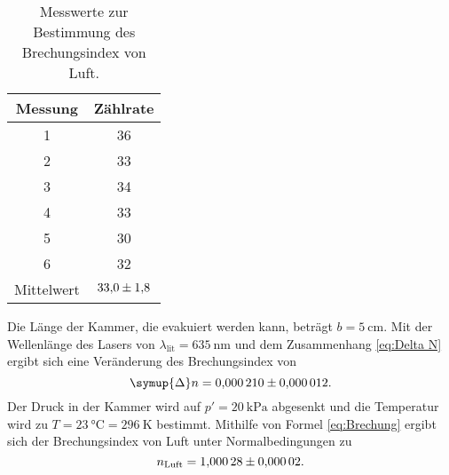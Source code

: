 \begin{table} [H]
    \centering
    \caption{Messwerte zur Bestimmung des Brechungsindex von Luft.}
    \label{tab:Brechungsindex}
    \begin{tabular}{S S}
      \toprule
      {Messung} & {Zählrate} \\
        & 36 \\
      2  & 33 \\
      3  & 34 \\
      4  & 33 \\
      5  & 30 \\
      6  & 32 \\
      \midrule
      {Mittelwert} & $\num{33.0+-1.8}$ \\  
      \bottomrule
    \end{tabular}
\end{table}

Die Länge der Kammer, die evakuiert werden kann, beträgt $b = \qty{5}{\centi\metre}$. Mit der Wellenlänge des Lasers von
$\lambda_{\text{lit}}=\qty{635}{\nano\metre}$ und dem Zusammenhang \eqref{eq:Delta N} ergibt sich eine Veränderung des 
Brechungsindex von
\begin{equation*}
    \symup{\Delta}n = \num{0.000210+-0.000012}.
\end{equation*}
Der Druck in der Kammer wird auf $p'=\qty{20}{\kilo\pascal}$ abgesenkt und die Temperatur wird zu 
$T=\qty{23}{\celsius}=\qty{296}{\kelvin}$ bestimmt.
Mithilfe von Formel \eqref{eq:Brechung} ergibt sich der Brechungsindex von Luft unter Normalbedingungen zu 
\begin{equation*}
    n_\text{Luft} = \num{1.00028+-0.00002}.
\end{equation*}